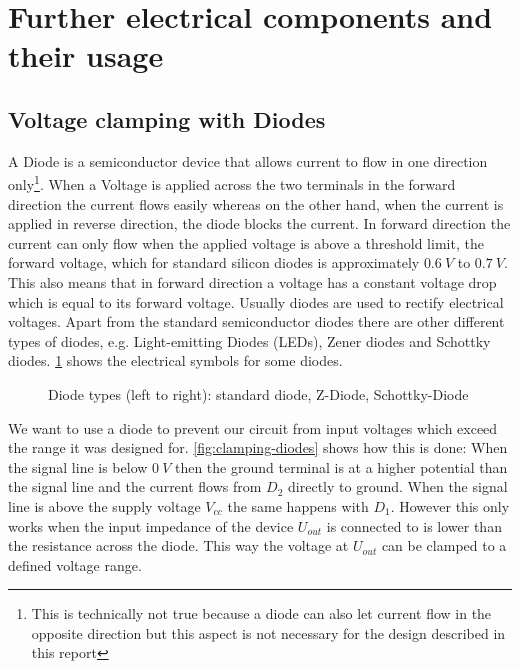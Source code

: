 \section{Further electrical components and their usage}

\subsection{Voltage clamping with Diodes}

A Diode is a semiconductor device  that allows current to flow in one direction only\footnote{This is technically not true because a diode can also let current flow in the opposite direction but this aspect is not necessary for the design described in this report}. When a Voltage is applied across the two terminals in the forward direction the current flows easily whereas on the other hand, when the current is applied in reverse direction, the diode blocks the current. In forward direction the current can only flow when the applied voltage is above a threshold limit, the forward voltage, which for standard silicon diodes is approximately $\SI{0.6}{V}$ to $\SI{0.7}{V}$. This also means that in forward direction a voltage has a constant voltage drop which is equal to its forward voltage. Usually diodes are used to rectify electrical voltages. Apart from the standard semiconductor diodes there are other different types of diodes, e.g. Light-emitting Diodes (LEDs), Zener diodes and Schottky diodes. \cref{fig:diode-types} shows the electrical symbols for some diodes.

\begin{figure}[htb]
	\centering
	\caption{Diode types (left to right): standard diode, Z-Diode, Schottky-Diode}
	\label{fig:diode-types}
\end{figure}

We want to use a diode to prevent our circuit from input voltages which exceed the range it was designed for. \cref{fig:clamping-diodes} shows how this is done: When the signal line is below $\SI{0}{V}$ then the ground terminal is at a higher potential than the signal line and the current flows from $D_2$ directly to ground. When the signal line is above the supply voltage $V_{cc}$ the same happens with $D_1$. However this only works when the input impedance of the device $U_{out}$ is connected to is lower than the resistance across the diode. This way the voltage at $U_{out}$ can be clamped to a defined voltage range.

